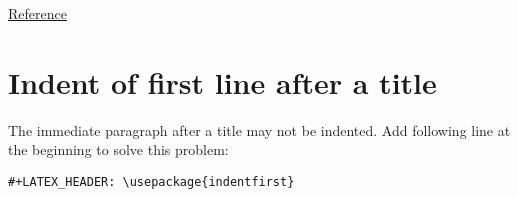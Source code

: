 \documentclass[12pt]{book}
\begin{document}
\href{https://emacs.stackexchange.com/questions/16889/how-to-control-newline-and-indent-when-export-to-latex-from-org-mode-file}{Reference}
\section{Indent of first line after a title}
\label{sec:org47da7dc}
The immediate paragraph after a title may not be indented. Add following line at the beginning to solve this problem:
\begin{verbatim}
#+LATEX_HEADER: \usepackage{indentfirst}
\end{verbatim}
\end{document}
